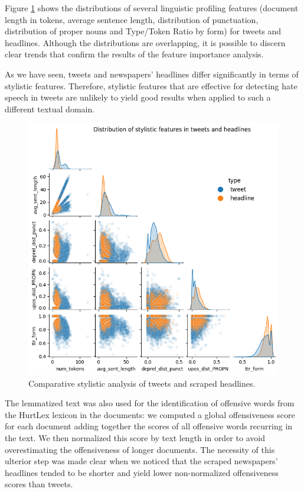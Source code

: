 Figure \ref{fig:style} shows the distributions of several linguistic profiling features (document length in tokens, average sentence length, distribution of punctuation, distribution of proper nouns and Type/Token Ratio by form) for tweets and headlines.
Although the distributions are overlapping, it is possible to discern clear trends that confirm the results of the feature importance analysis.

As we have seen, tweets and newspapers' headlines differ significantly in terms of stylistic features.
Therefore, stylistic features that are effective for detecting hate speech in tweets are unlikely to yield good results when applied to such a different textual domain.

\begin{figure}
    \includegraphics[width=\columnwidth]{../../results/images/style.png}
    \caption{Comparat{}ive stylistic analysis of tweets and scraped headlines.}
    \label{fig:style}
\end{figure}

The lemmatized text was also used for the identification of offensive words from the HurtLex lexicon in the documents: we computed a global offensiveness score for each document adding together the scores of all offensive words recurring in the text.
We then normalized this score by text length in order to avoid overestimating the offensiveness of longer documents.
The necessity of this ulterior step was made clear when we noticed that the scraped newspapers' headlines tended to be shorter and yield lower non-normalized offensiveness scores than tweets.
